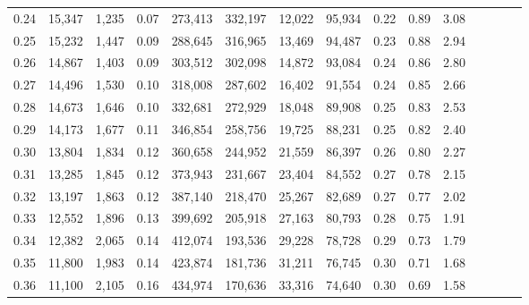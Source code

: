 \begin{tabular}{rrrcrrrrrrrrrrr}
0.24 &  15,347 &  1,235 &                                       0.07 &  273,413 &  332,197 &   12,022 &   95,934 &  0.22 &  0.89 &                         3.08 \\
0.25 &  15,232 &  1,447 &                                       0.09 &  288,645 &  316,965 &   13,469 &   94,487 &  0.23 &  0.88 &                         2.94 \\
0.26 &  14,867 &  1,403 &                                       0.09 &  303,512 &  302,098 &   14,872 &   93,084 &  0.24 &  0.86 &                         2.80 \\
0.27 &  14,496 &  1,530 &                                       0.10 &  318,008 &  287,602 &   16,402 &   91,554 &  0.24 &  0.85 &                         2.66 \\
0.28 &  14,673 &  1,646 &                                       0.10 &  332,681 &  272,929 &   18,048 &   89,908 &  0.25 &  0.83 &                         2.53 \\
0.29 &  14,173 &  1,677 &                                       0.11 &  346,854 &  258,756 &   19,725 &   88,231 &  0.25 &  0.82 &                         2.40 \\
0.30 &  13,804 &  1,834 &                                       0.12 &  360,658 &  244,952 &   21,559 &   86,397 &  0.26 &  0.80 &                         2.27 \\
0.31 &  13,285 &  1,845 &                                       0.12 &  373,943 &  231,667 &   23,404 &   84,552 &  0.27 &  0.78 &                         2.15 \\
0.32 &  13,197 &  1,863 &                                       0.12 &  387,140 &  218,470 &   25,267 &   82,689 &  0.27 &  0.77 &                         2.02 \\
0.33 &  12,552 &  1,896 &                                       0.13 &  399,692 &  205,918 &   27,163 &   80,793 &  0.28 &  0.75 &                         1.91 \\
0.34 &  12,382 &  2,065 &                                       0.14 &  412,074 &  193,536 &   29,228 &   78,728 &  0.29 &  0.73 &                         1.79 \\
0.35 &  11,800 &  1,983 &                                       0.14 &  423,874 &  181,736 &   31,211 &   76,745 &  0.30 &  0.71 &                         1.68 \\
0.36 &  11,100 &  2,105 &                                       0.16 &  434,974 &  170,636 &   33,316 &   74,640 &  0.30 &  0.69 &                         1.58 \\

\end{tabular}
